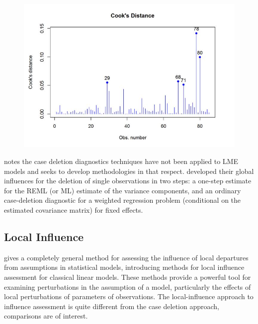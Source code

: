 \documentclass[12pt, a4paper]{report}
\theoremstyle{definition}
\theoremstyle{remark}
\begin{document}
\begin{figure}[h!]
\centering
\includegraphics[width=0.9\linewidth]{images/CooksDistancePlot-JS-Roy}
\caption{}
\label{fig:CooksDistancePlot-JS-Roy}
\end{figure}
%
\citet{Christensen} notes the case deletion diagnostics techniques have not been applied to LME models and seeks to develop methodologies in that respect. \citet{Christensen} developed their global influences for the deletion of single observations in two steps: a one-step estimate for the REML (or ML) estimate of the variance components, and an ordinary case-deletion diagnostic for a weighted regression problem (conditional on the estimated covariance matrix) for fixed effects.








\subsection{Local Influence}
\citet{cook86} gives a completely general method for assessing the influence of local departures from assumptions in statistical models, introducing methods for local influence assessment for classical linear models. These methods provide a powerful tool for examining perturbations in the assumption of a model, particularly the effects of local perturbations of parameters of observations. The local-influence approach to influence assessment is quite different from the case deletion approach, comparisons are of interest.
\end{document}
